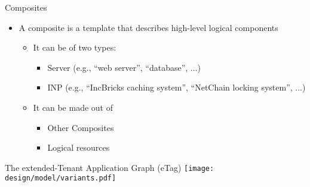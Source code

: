 \begin{frame}{Composites}
    \begin{itemize}
        \item A composite is a template that describes high-level logical components
        \begin{itemize}
            \item It can be of two types:
            \begin{itemize}
                \item Server (e.g., “web server”, “database”, ...)
                \item INP (e.g., “IncBricks caching system”, “NetChain locking system”, ...)
            \end{itemize}
            \item It can be made out of
            \begin{itemize}
                \item Other Composites
                \item Logical resources
            \end{itemize}
        \end{itemize}
    \end{itemize}
\end{frame}

\begin{frame}{The extended-Tenant Application Graph (eTag)}
    \centering
    \texttt{[image: design/model/variants.pdf]}
\end{frame}


